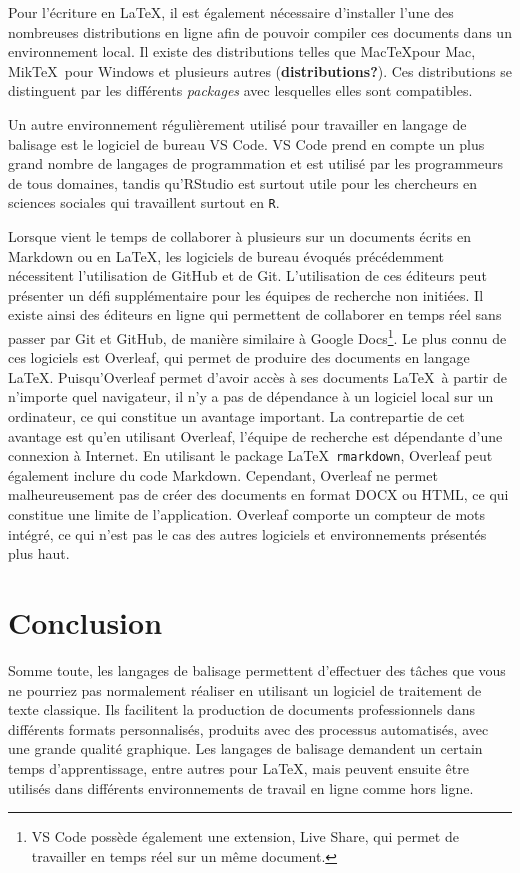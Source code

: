 \documentclass[
  letterpaper,
]{scrbook}
\begin{document}
Pour l'écriture en \LaTeX, il est également nécessaire d'installer l'une
des nombreuses distributions en ligne afin de pouvoir compiler ces
documents dans un environnement local. Il existe des distributions
telles que Mac\TeX pour Mac, Mik\TeX~pour Windows et plusieurs autres
(\textbf{distributions?}). Ces distributions se distinguent par les
différents \emph{packages} avec lesquelles elles sont compatibles.

Un autre environnement régulièrement utilisé pour travailler en langage
de balisage est le logiciel de bureau VS Code. VS Code prend en compte
un plus grand nombre de langages de programmation et est utilisé par les
programmeurs de tous domaines, tandis qu'RStudio est surtout utile pour
les chercheurs en sciences sociales qui travaillent surtout en
\texttt{R}.

Lorsque vient le temps de collaborer à plusieurs sur un documents écrits
en Markdown ou en \LaTeX, les logiciels de bureau évoqués précédemment
nécessitent l'utilisation de GitHub et de Git. L'utilisation de ces
éditeurs peut présenter un défi supplémentaire pour les équipes de
recherche non initiées. Il existe ainsi des éditeurs en ligne qui
permettent de collaborer en temps réel sans passer par Git et GitHub, de
manière similaire à Google Docs\footnote{VS Code possède également une
  extension, Live Share, qui permet de travailler en temps réel sur un
  même document.}. Le plus connu de ces logiciels est Overleaf, qui
permet de produire des documents en langage \LaTeX. Puisqu'Overleaf
permet d'avoir accès à ses documents \LaTeX~à partir de n'importe quel
navigateur, il n'y a pas de dépendance à un logiciel local sur un
ordinateur, ce qui constitue un avantage important. La contrepartie de
cet avantage est qu'en utilisant Overleaf, l'équipe de recherche est
dépendante d'une connexion à Internet. En utilisant le package
\LaTeX~\texttt{rmarkdown}, Overleaf peut également inclure du code
Markdown. Cependant, Overleaf ne permet malheureusement pas de créer des
documents en format DOCX ou HTML, ce qui constitue une limite de
l'application. Overleaf comporte un compteur de mots intégré, ce qui
n'est pas le cas des autres logiciels et environnements présentés plus
haut.

\hypertarget{conclusion}{%
\section{Conclusion}\label{conclusion}}

Somme toute, les langages de balisage permettent d'effectuer des tâches
que vous ne pourriez pas normalement réaliser en utilisant un logiciel
de traitement de texte classique. Ils facilitent la production de
documents professionnels dans différents formats personnalisés, produits
avec des processus automatisés, avec une grande qualité graphique. Les
langages de balisage demandent un certain temps d'apprentissage, entre
autres pour \LaTeX, mais peuvent ensuite être utilisés dans différents
environnements de travail en ligne comme hors ligne.
\end{document}
